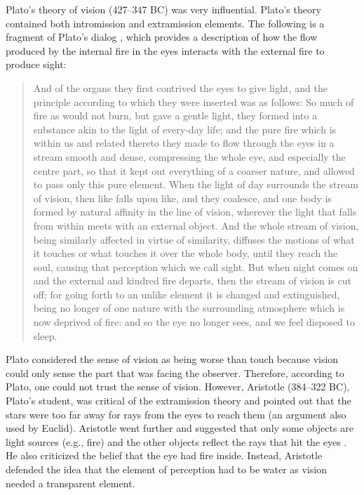 Plato’s theory of vision (427--347 BC) was very influential. Plato's theory contained both intromission and extramission elements. The following is a fragment of Plato's dialog  \cite{Plato360bc}, which provides a description of how the flow produced by the internal fire in the eyes interacts with the external fire to produce sight:


\begin{quote}
And of the organs they first contrived the eyes to give light, and the principle according to which
they were inserted was as follows: So much of fire as would not burn,
but gave a gentle light, they formed into a substance akin to the
light of every-day life; and the pure fire which is within us and
related thereto they made to flow through the eyes in a stream smooth
and dense, compressing the whole eye, and especially the centre part,
so that it kept out everything of a coarser nature, and allowed to
pass only this pure element. When the light of day surrounds the stream
of vision, then like falls upon like, and they coalesce, and one body
is formed by natural affinity in the line of vision, wherever the
light that falls from within meets with an external object. And the
whole stream of vision, being similarly affected in virtue of similarity,
diffuses the motions of what it touches or what touches it over the
whole body, until they reach the soul, causing that perception which
we call sight. But when night comes on and the external and kindred
fire departs, then the stream of vision is cut off; for going forth
to an unlike element it is changed and extinguished, being no longer
of one nature with the surrounding atmosphere which is now deprived
of fire: and so the eye no longer sees, and we feel disposed to sleep.
\end{quote}


Plato considered the sense of vision as being worse than touch because vision could only sense the part that was facing the observer. Therefore, according to Plato, one could not trust the sense of vision. However, Aristotle (384--322 BC), Plato's student, was critical of the extramission theory and pointed out that the stars were too far away for rays from the eyes to reach them (an argument also used by Euclid). Aristotle went further and suggested that only some objects are light sources (e.g., fire) and the other objects reflect the rays that hit the eyes \cite{Aristotle350bc}. He also criticized the belief that the eye had fire inside. Instead, Aristotle defended the idea that the element of perception had to be water as vision needed a transparent element.


